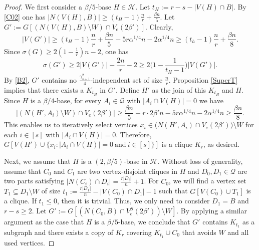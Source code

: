 \documentclass[11pt, a4paper]{article}
\theoremstyle{definition}
\newcommand{\<}{\subseteq}
\begin{document}
\begin{proof}%

We first consider a $\beta/5$-base $H\in \mathcal{H}$. Let $t_H:=r-s-|V(H)\cap B|$. By \ref{C02} one has $|N(V(H),B)|\ge (t_H-1)\frac{n}{r}+\frac{\beta n}{5}$. Let $G':=G[(N(V(H), B)\setminus W)\cap V_{e}(2\beta')]$. Clearly, 
$$|V(G')|\ge (t_H-1)\frac{n}{r}+\frac{\beta n}{5}-5r\alpha^{1/4} n-2\alpha^{1/4} n\ge (t_h-1)\frac{n}{r}+\frac{\beta n}{8}.$$ 
Since $\sigma(G)\ge 2(1-\frac{1}{r})n-2$, one has 
$$\sigma(G')\ge 2|V(G')|-\frac{2n}{r}-2\ge 2\Big(1-\frac{1}{t_H-1}\Big)|V(G')|.$$
By \ref{B2}, $G'$ contains no $\frac{\gamma_{s+1}^2}{4}$-independent set of size $\frac{n}{r}$. %
Proposition \ref{SuperT} implies that there exists a $K_{t_H}$ in $G'$. Define  $H'$ as the join of this $K_{t_H}$ and $H$. Since $H$ is a $\beta/4$-base, for every $A_i\in\mathcal{Q}$ with $|A_i\cap V(H)|=0$ we have
$$|(N(H',A_i)\setminus W)\cap V_e(2\beta')|\ge \frac{\beta n}{5}-r \cdot 2\beta' n-5r\alpha^{1/4} n-2\alpha^{1/4} n\ge \frac{\beta n}{8}.$$
This enables us to iteratively select vertices $x_i\in \big(N(H',A_i)\cap V_e(2\beta')\big)\setminus W$ for each $i\in [s]$ with $|A_i\cap V(H)|=0$. Therefore, $G[V(H')\cup \{x_i:|A_i\cap V(H)|=0\ \text{and}\ i\in [s]\}]$ is a clique $K_r$, as desired. %

Next, we assume that $H$ is a $(2,\beta/5)$-base in $\mathcal{H}$. %
Without loss of generality, assume that $C_0$ and $C_1$ are two vertex-disjoint cliques in $H$ and $D_0, D_1 \in \mathcal{Q}$ are two parts satisfying $|N(C_i)\cap D_i|=\frac{r|D_i|}{n}+1$. %
For $C_0$, we will find a vertex set $T_1\subseteq D_1\setminus W$ of size $t_1:=\frac{r|D_1|}{n}-|V(C_0)\cap D_1|-1$ such that $G[V(C_0)\cup T_1]$ is a clique. %
If $t_1\le0$, then it is trivial. Thus, we only need to consider $D_1=B$ and $r-s\ge 2$. Let $G':=G[(N(C_0,B)\cap V_{e}^S(2\beta'))\setminus W]$. %
By applying a similar argument as the case that $H$ is a $\beta/5$-base, we conclude that 
$G'$ contains $K_{t_1}$ as a subgraph and there exists a copy of $K_r$ covering $K_{t_1}\cup C_0$ that avoids $W$ and all used vertices. 


\end{proof}
\end{document}

